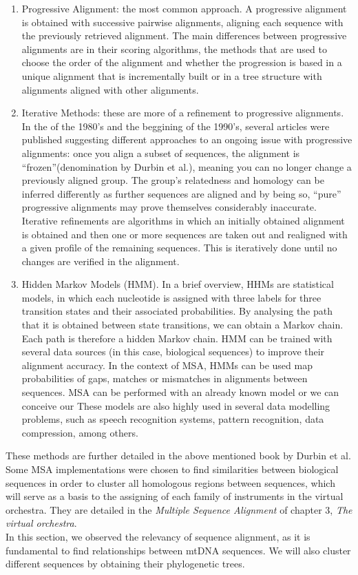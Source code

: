 \documentclass[11pt,twoside,a4paper]{report}
\begin{document}
\begin{enumerate}
\item Progressive Alignment: the most common approach. A progressive alignment is obtained with successive pairwise alignments, aligning each sequence with the previously retrieved alignment. The main differences between progressive alignments are in their scoring algorithms, the methods that are used to choose the order of the alignment and whether the progression is based in a unique alignment that is incrementally built or in a tree structure with alignments aligned with other alignments. 
\item Iterative Methods: these are more of a refinement to progressive alignments. In the of the 1980's and the beggining of the 1990's, several articles were published\cite{progressive_align1}\cite{progressive_align2} suggesting different approaches to an ongoing issue with progressive alignments: once you align a subset of sequences, the alignment is ``frozen''(denomination by Durbin et al.), meaning you can no longer change a previously aligned group. The group's relatedness and homology can be inferred differently as further sequences are aligned and by being so, ``pure'' progressive alignments may prove themselves considerably inaccurate. Iterative refinements are algorithms in which an initially obtained alignment is obtained and then one or more sequences are taken out and realigned with a given profile of the remaining sequences. This is iteratively done until no changes are verified in the alignment.  
\item Hidden Markov Models\cite{markov} (HMM). In a brief overview, HHMs are statistical models, in which each nucleotide is assigned with three labels for three transition states and their associated probabilities. By analysing the path that it is obtained between state transitions, we can obtain a Markov chain. Each path is therefore a hidden Markov chain. HMM can be trained with several data sources (in this case, biological sequences) to improve their alignment accuracy. In the context of MSA, HMMs can be used map probabilities of gaps, matches or mismatches in alignments between sequences. MSA can be performed with an already known model or we can conceive our These models are also highly used in several data modelling problems, such as speech recognition systems, pattern recognition, data compression, among others\cite{markov_bayes}. 
\end{enumerate}

These methods are further detailed in the above mentioned book by Durbin et al. Some MSA implementations were chosen to find similarities between biological sequences in order to cluster all homologous regions between sequences, which will serve as a basis to the assigning of each family of instruments in the virtual orchestra.  They are detailed in the \textit{Multiple Sequence Alignment} of chapter 3, \textit{The virtual orchestra}.\\
In this section, we observed the relevancy of sequence alignment, as it is fundamental to find  relationships between mtDNA sequences. We will also cluster different sequences by obtaining their phylogenetic trees. 
\end{document}
